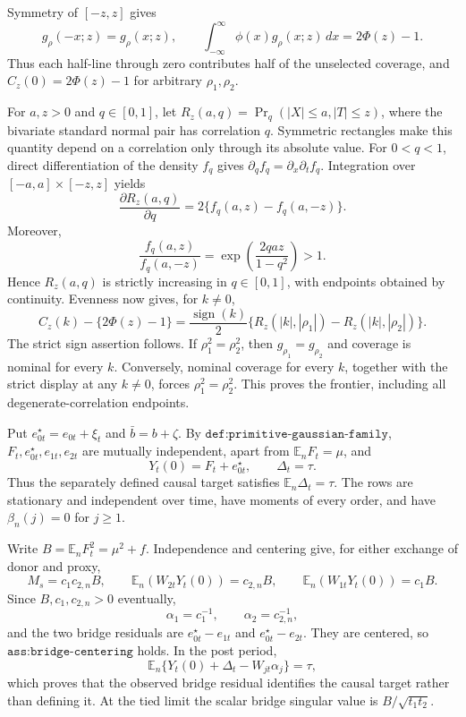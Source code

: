 Symmetry of \([-z,z]\) gives
\[
 g_\rho(-x;z)=g_\rho(x;z),
 \qquad
 \int_{-\infty}^{\infty}\phi(x)g_\rho(x;z)\,dx=2\Phi(z)-1.
\]
Thus each half-line through zero contributes half of the unselected coverage, and \(C_z(0)=2\Phi(z)-1\) for arbitrary \(\rho_1,\rho_2\).

For \(a,z>0\) and \(q\in[0,1]\), let \(R_z(a,q)=\Pr_q(|X|\leq a,|T|\leq z)\), where the bivariate standard normal pair has correlation \(q\).  Symmetric rectangles make this quantity depend on a correlation only through its absolute value.  For \(0<q<1\), direct differentiation of the density \(f_q\) gives \(\partial_qf_q=\partial_x\partial_tf_q\).  Integration over \([-a,a]\times[-z,z]\) yields
\[
 \frac{\partial R_z(a,q)}{\partial q}
 =2\{f_q(a,z)-f_q(a,-z)\}.
\]
Moreover,
\[
 \frac{f_q(a,z)}{f_q(a,-z)}
 =\exp\left(\frac{2qaz}{1-q^2}\right)>1.
\]
Hence \(R_z(a,q)\) is strictly increasing in \(q\in[0,1]\), with endpoints obtained by continuity.  Evenness now gives, for \(k\ne0\),
\[
 C_z(k)-\{2\Phi(z)-1\}
 =\frac{\operatorname{sign}(k)}2
 \{R_z(|k|,|\rho_1|)-R_z(|k|,|\rho_2|)\}.
\]
The strict sign assertion follows.  If \(\rho_1^2=\rho_2^2\), then \(g_{\rho_1}=g_{\rho_2}\) and coverage is nominal for every \(k\).  Conversely, nominal coverage for every \(k\), together with the strict display at any \(k\ne0\), forces \(\rho_1^2=\rho_2^2\).  This proves the frontier, including all degenerate-correlation endpoints.

Put \(e_{0t}^{\star}=e_{0t}+\xi_t\) and \(\bar b=b+\zeta\).  By \(\texttt{def:primitive-gaussian-family}\), \(F_t,e_{0t}^{\star},e_{1t},e_{2t}\) are mutually independent, apart from \(\mathbb E_nF_t=\mu\), and
\[
 Y_t(0)=F_t+e_{0t}^{\star},\qquad \Delta_t=\tau.
\]
Thus the separately defined causal target satisfies \(\mathbb E_n\Delta_t=\tau\).  The rows are stationary and independent over time, have moments of every order, and have \(\beta_n(j)=0\) for \(j\geq1\).

Write \(B=\mathbb E_nF_t^2=\mu^2+f\).  Independence and centering give, for either exchange of donor and proxy,
\[
 M_s=c_1c_{2,n}B,\qquad
 \mathbb E_n(W_{2t}Y_t(0))=c_{2,n}B,\qquad
 \mathbb E_n(W_{1t}Y_t(0))=c_1B.
\]
Since \(B,c_1,c_{2,n}>0\) eventually,
\[
 \alpha_1=c_1^{-1},\qquad \alpha_2=c_{2,n}^{-1},
\]
and the two bridge residuals are \(e_{0t}^{\star}-e_{1t}\) and \(e_{0t}^{\star}-e_{2t}\).  They are centered, so \(\texttt{ass:bridge-centering}\) holds.  In the post period,
\[
 \mathbb E_n\{Y_t(0)+\Delta_t-W_{jt}\alpha_j\}=\tau,
\]
which proves that the observed bridge residual identifies the causal target rather than defining it.  At the tied limit the scalar bridge singular value is \(B/\sqrt{t_1t_2}\).

